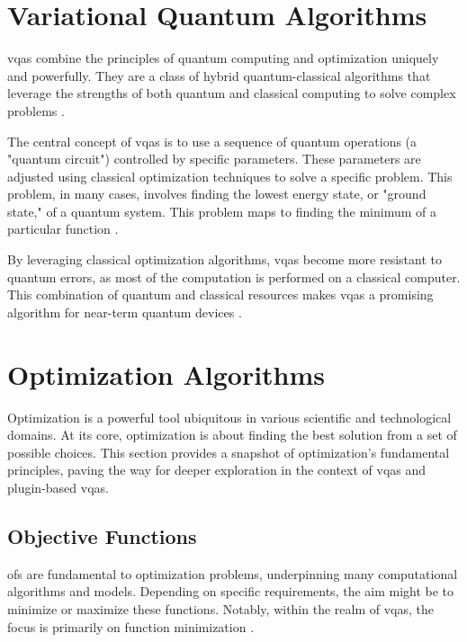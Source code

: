 \documentclass[
  a4paper,  %
  twoside,  %
  bibliography=totoc,
  headsepline,
  cleardoublepage=empty,
  parskip=half,
  draft=false
]{scrbook}
\begin{document}
\section{Variational Quantum Algorithms}
\label{sec:variationalQuantumAlgorithms}

\glspl{vqa} combine the principles of quantum computing and optimization uniquely and powerfully.
They are a class of hybrid quantum-classical algorithms that leverage the strengths of both quantum and classical computing to solve complex problems \cite{McClean2016}.

The central concept of \glspl{vqa} is to use a sequence of quantum operations (a "quantum circuit") controlled by specific parameters.
These parameters are adjusted using classical optimization techniques to solve a specific problem.
This problem, in many cases, involves finding the lowest energy state, or "ground state," of a quantum system.
This problem maps to finding the minimum of a particular function \cite{Peruzzo2013}.

By leveraging classical optimization algorithms, \glspl{vqa} become more resistant to quantum errors, as most of the computation is performed on a classical computer.
This combination of quantum and classical resources makes \glspl{vqa} a promising algorithm for near-term quantum devices \cite{Moll2017}.


\section{Optimization Algorithms}
\label{sec:optimizationAlgorithms}
Optimization is a powerful tool ubiquitous in various scientific and technological domains.
At its core, optimization is about finding the best solution from a set of possible choices.
This section provides a snapshot of optimization's fundamental principles, paving the way for deeper exploration in the context of \glspl{vqa} and plugin-based \glspl{vqa}.

\subsection{Objective Functions}
\label{subsec:objectiveFunctions}
\glspl{of} are fundamental to optimization problems, underpinning many computational algorithms and models.
Depending on specific requirements, the aim might be to minimize or maximize these functions.
Notably, within the realm of \glspl{vqa}, the focus is primarily on function minimization \cite{Weinan2017}.
\end{document}
